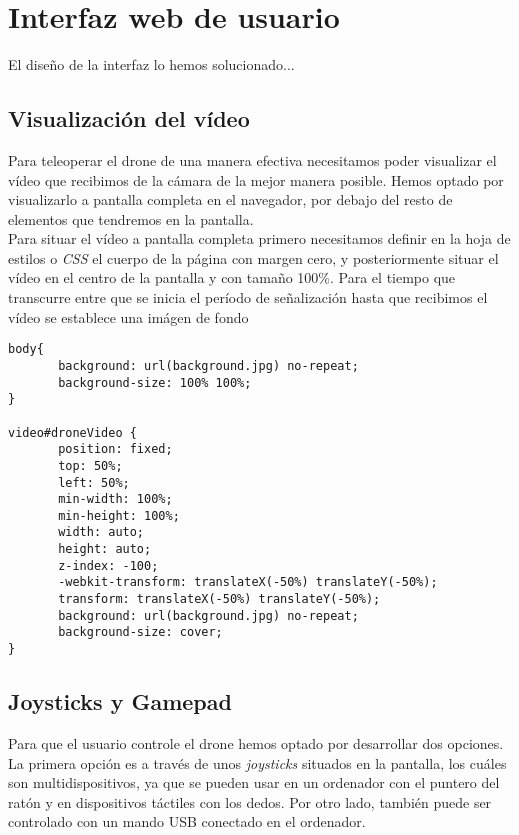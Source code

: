 \section{Interfaz web de usuario}

El diseño de la interfaz lo hemos solucionado...

\subsection{Visualización del vídeo}

Para teleoperar el drone de una manera efectiva necesitamos poder visualizar el vídeo que recibimos de la cámara de la mejor manera posible. Hemos optado por visualizarlo a pantalla completa en el navegador, por debajo del resto de elementos que tendremos en la pantalla.\\

Para situar el vídeo a pantalla completa primero necesitamos definir en la hoja de estilos o \emph{CSS} el cuerpo de la página con margen cero, y posteriormente situar el vídeo en el centro de la pantalla y con tamaño 100\%. Para el tiempo que transcurre entre que se inicia el período de señalización hasta que recibimos el vídeo se establece una imágen de fondo\\

\begin{lstlisting}[caption=Vídeo a pantalla completa.]
body{
       background: url(background.jpg) no-repeat;
       background-size: 100% 100%;
}

video#droneVideo { 
       position: fixed;
       top: 50%;
       left: 50%;
       min-width: 100%;
       min-height: 100%;
       width: auto;
       height: auto;
       z-index: -100;
       -webkit-transform: translateX(-50%) translateY(-50%);
       transform: translateX(-50%) translateY(-50%);
       background: url(background.jpg) no-repeat;
       background-size: cover; 
}
\end{lstlisting}

\subsection{Joysticks y Gamepad}\label{subsec:joysticks}

Para que el usuario controle el drone hemos optado por desarrollar dos opciones. La primera opción es a través de unos \emph{joysticks} situados en la pantalla, los cuáles son multidispositivos, ya que se pueden usar en un ordenador con el puntero del ratón y en dispositivos táctiles con los dedos. Por otro lado, también puede ser controlado con un mando USB conectado en el ordenador.

